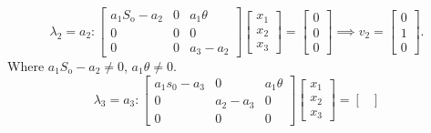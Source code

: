 \documentclass[
    8pt,
    aspectratio=1610,
    c,
    intlimits,
		handout,
    leqno,
    professionalfonts,
]{beamer}
\begin{document}
\begin{frame}
	\begin{equation*}
		\lambda_{2}=
		a_{2}:
		\begin{bmatrix}
			a_{1}S_{\text{o}}-a_{2} & 0 & a_{1} \theta \\
			0                       & 0 & 0            \\
			0                       & 0 & a_{3}-a_{2}
		\end{bmatrix}
		\begin{bmatrix}
			x_{1} \\
			x_{2} \\
			x_{3}
		\end{bmatrix}=
		\begin{bmatrix}
			0 \\
			0 \\
			0
		\end{bmatrix}\implies
		v_{2}=
		\begin{bmatrix}
			0 \\
			1 \\
			0
		\end{bmatrix}.
	\end{equation*}
	Where $a_{1}S_{\text{o}}-a_{2}\neq0$, $a_{1}\theta\neq 0$.
	\begin{equation*}
		\lambda_{3}=
		a_{3}:
		\begin{bmatrix}
			a_{1} s_{0}-a_{3} & 0           & a_{1} \theta \\
			0                 & a_{2}-a_{3} & 0            \\
			0                 & 0           & 0
		\end{bmatrix}
		\begin{bmatrix}
			x_{1} \\
			x_{2} \\
			x_{3}
		\end{bmatrix}=
		\begin{bmatrix}

\end{bmatrix}
\end{equation*}
\end{frame}
\end{document}
